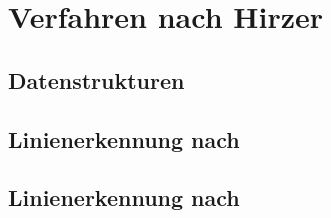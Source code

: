 \section{Verfahren nach Hirzer} %
\label{sec:hirzer}

\subsection{Datenstrukturen} %
\label{sub:datenstrukturen}









% 


\subsection{Linienerkennung nach \citeauthor{clarke96}} %
\label{sub:linienerkennung_nach_clarke96}




\subsection{Linienerkennung nach \citeauthor{hirzer08}} %
\label{sub:linienerkennung_nach_hirzer08}




% 
% 
% 

